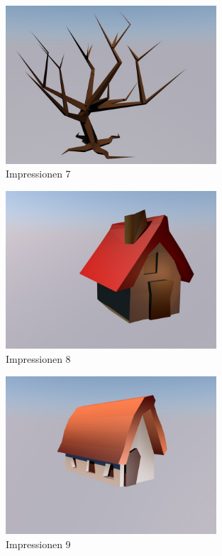 \begin{figure}[!htbp]%
	\centering
		\includegraphics[width=0.7\textwidth]{images/anhang_7}
	\caption{Impressionen 7}
	\label{fig:Impressionen}
\end{figure}

\begin{figure}[!htbp]%
	\centering
		\includegraphics[width=0.7\textwidth]{images/anhang_8}
	\caption{Impressionen 8}
	\label{fig:Impressionen}
\end{figure}

\begin{figure}[!htbp]%
	\centering
		\includegraphics[width=0.7\textwidth]{images/anhang_9}
	\caption{Impressionen 9}
	\label{fig:Impressionen}
\end{figure}